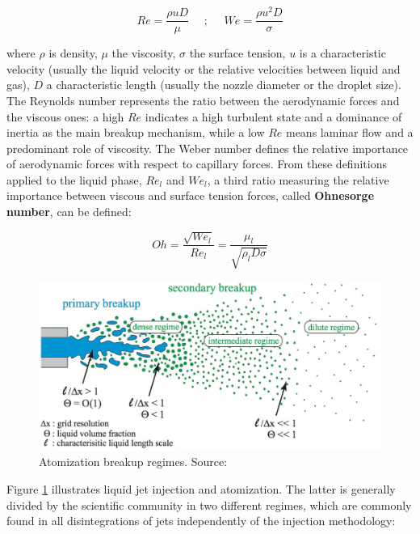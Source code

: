 \begin{equation}
\label{eq:ch1_intro_Re_and_We_general_definitions}
	Re = \frac{\rho u D}{\mu} ~~~~~~ ;  ~~~~~~ We = \frac{\rho u^2 D}{\sigma}
\end{equation}

where $\rho$ is density, $\mu$ the viscosity, $\sigma$ the surface tension, $u$ is a characteristic velocity (usually the liquid velocity or the relative velocities between liquid and gas), $D$ a characteristic length (usually the nozzle diameter or the droplet size). The Reynolds number represents the ratio between the aerodynamic forces and the viscous ones: a high $Re$ indicates a high turbulent state and a dominance of inertia as the main breakup mechanism, while a low $Re$ means laminar flow and a predominant role of viscosity. The Weber number defines the relative importance of aerodynamic forces with respect to capillary forces. From these definitions applied to the liquid phase, $Re_l$ and $We_l$, a third ratio measuring the relative importance between viscous and surface tension forces, called \textbf{Ohnesorge number}, can be defined:

\begin{equation}
Oh = \frac{\sqrt{We_l}}{Re_l} = \frac{\mu_l}{\sqrt{\rho_l D \sigma}}
\end{equation}

\begin{figure}[h!]
	\centering
	\includegraphics[scale=0.5]{./part0_intro/atomization-regimes-scheme}
	\caption[Atomization breakup regimes]{Atomization breakup regimes. Source: }
	\label{fig:atomization_regimes_herrmann}
\end{figure}

Figure \ref{fig:atomization_regimes_herrmann} illustrates liquid jet injection and atomization. The latter is generally divided by the scientific community in two different regimes, which are commonly found in all disintegrations of jets independently of the injection methodology:

